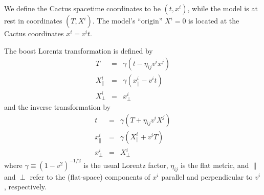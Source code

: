 We define the Cactus spacetime coordinates to be $(t,x^i)$,
while the model is at rest in coordinates $(T,X^i)$.  The model's
``origin'' $X^i = 0$ is located at the Cactus coordinates $x^i = v^i t$.  

The boost Lorentz transformation is defined by
\begin{equation}
\renewcommand{\arraystretch}{1.333}
\begin{array}{lcl}
T		& = &	\gamma (t - \eta_{ij} v^i x^j)		\\
X^i_\parallel	& = &	\gamma (x^i_\parallel - v^i t)		\\
X^i_\perp	& = &	x^i_\perp				%
\end{array}
\end{equation}
and the inverse transformation by
\begin{equation}
\renewcommand{\arraystretch}{1.333}
\begin{array}{lcl}
t		& = &	\gamma (T + \eta_{ij} v^i X^j)		\\
x^i_\parallel	& = &	\gamma (X^i_\parallel + v^i T)		\\
x^i_\perp	& = &	X^i_\perp				%
\end{array}
\end{equation}
where $\gamma \equiv (1 - v^2)^{-1/2}$ is the usual Lorentz factor,
$\eta_{ij}$ is the flat metric, and $\parallel$ and $\perp$ refer
to the (flat-space) components of $x^i$ parallel and perpendicular
to $v^i$, respectively.

